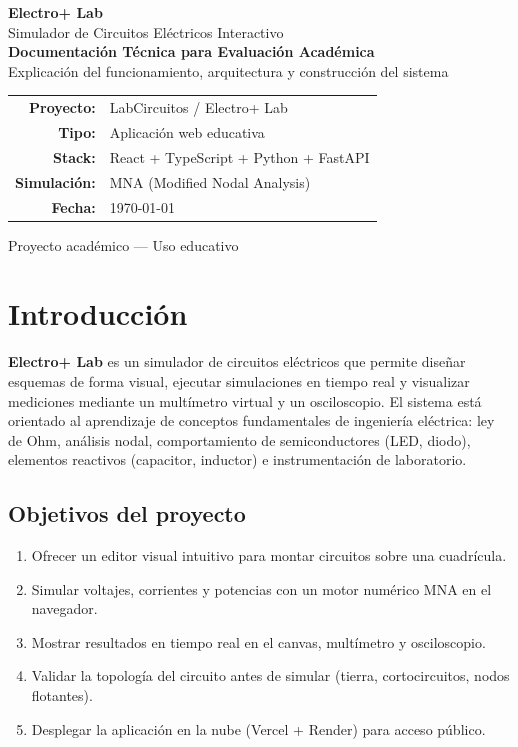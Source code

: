 \documentclass[12pt,a4paper]{article}
\begin{document}
\begin{titlepage}
  \centering
  \vspace*{2.5cm}
  {\Huge\bfseries\color{primary} Electro+ Lab\\[0.4em]}
  {\Large Simulador de Circuitos Eléctricos Interactivo\\[1.5cm]}
  {\large\textbf{Documentación Técnica para Evaluación Académica}\\[0.8cm]}
  {\normalsize Explicación del funcionamiento, arquitectura y construcción del sistema\\[2.5cm]}
  \begin{tabular}{rl}
    \textbf{Proyecto:} & LabCircuitos / Electro+ Lab \\
    \textbf{Tipo:} & Aplicación web educativa \\
    \textbf{Stack:} & React + TypeScript + Python + FastAPI \\
    \textbf{Simulación:} & MNA (Modified Nodal Analysis) \\
    \textbf{Fecha:} & \today \\
  \end{tabular}
  \vfill
  {\small Proyecto académico --- Uso educativo}
\end{titlepage}

\tableofcontents
\newpage

\section{Introducción}

\textbf{Electro+ Lab} es un simulador de circuitos eléctricos que permite diseñar esquemas de forma visual, ejecutar simulaciones en tiempo real y visualizar mediciones mediante un multímetro virtual y un osciloscopio. El sistema está orientado al aprendizaje de conceptos fundamentales de ingeniería eléctrica: ley de Ohm, análisis nodal, comportamiento de semiconductores (LED, diodo), elementos reactivos (capacitor, inductor) e instrumentación de laboratorio.

\subsection{Objetivos del proyecto}

\begin{enumerate}[label=\arabic*.]
  \item Ofrecer un editor visual intuitivo para montar circuitos sobre una cuadrícula.
  \item Simular voltajes, corrientes y potencias con un motor numérico MNA en el navegador.
  \item Mostrar resultados en tiempo real en el canvas, multímetro y osciloscopio.
  \item Validar la topología del circuito antes de simular (tierra, cortocircuitos, nodos flotantes).
  \item Desplegar la aplicación en la nube (Vercel + Render) para acceso público.
\end{enumerate}
\end{document}
